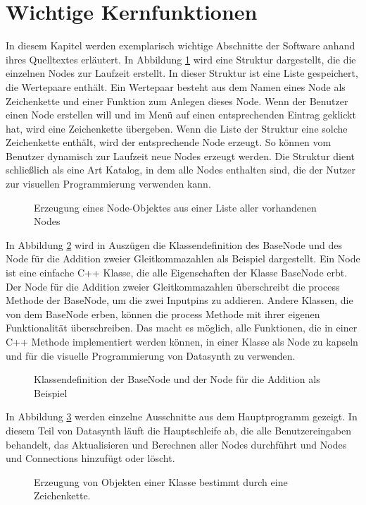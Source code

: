 \documentclass[a4paper, 
               12pt,
               DIV=calc,
               version=first,
               pdftex,
               headsepline,
               footsepline,
               bibtotocnumbered,
               liststotocnumbered]{scrreprt}
\begin{document}
\section{Wichtige Kernfunktionen}
\label{sec:Kernfunktionen}
In diesem Kapitel werden exemplarisch wichtige Abschnitte der Software anhand ihres Quelltextes
erläutert.
In Abbildung \ref{fig:factory} wird eine Struktur dargestellt, die die einzelnen
Nodes zur Laufzeit erstellt. In dieser Struktur ist eine Liste gespeichert, die Wertepaare
enthält. Ein Wertepaar besteht aus dem Namen eines Node als Zeichenkette und einer Funktion
zum Anlegen dieses Node.
Wenn der Benutzer einen Node erstellen will und im Menü auf einen entsprechenden Eintrag geklickt hat,
wird eine Zeichenkette übergeben. Wenn die Liste der Struktur eine solche Zeichenkette enthält, wird der
entsprechende Node erzeugt. So können vom Benutzer dynamisch zur Laufzeit
neue Nodes erzeugt werden. Die Struktur dient schließlich als eine Art Katalog, in dem alle
Nodes enthalten sind, die der Nutzer zur visuellen Programmierung verwenden kann.
\begin{figure}
\centering

\caption{Erzeugung eines Node-Objektes aus einer Liste aller vorhandenen Nodes}
\label{fig:factory}
\end{figure}
In Abbildung \ref{fig:node} wird in Auszügen die Klassendefinition des BaseNode und
des Node für die Addition zweier Gleitkommazahlen als Beispiel dargestellt.
Ein Node ist eine einfache C++ Klasse, die alle Eigenschaften der Klasse BaseNode erbt.
Der Node für die Addition zweier Gleitkommazahlen überschreibt die process Methode der BaseNode, um die zwei
Inputpins zu addieren. Andere Klassen, die von dem BaseNode erben, können die process
Methode mit ihrer eigenen Funktionalität überschreiben.
Das macht es möglich, alle Funktionen, die in einer C++ Methode implementiert werden können,
in einer Klasse als Node zu kapseln und für die visuelle Programmierung von Datasynth zu verwenden.
\begin{figure}
\centering

\caption{Klassendefinition der BaseNode und der Node für die Addition als Beispiel}
\label{fig:node}
\end{figure}
In Abbildung \ref{fig:core} werden einzelne Ausschnitte aus dem Hauptprogramm gezeigt.
In diesem Teil von Datasynth läuft die Hauptschleife ab, die alle Benutzereingaben behandelt,
das Aktualisieren und Berechnen aller Nodes durchführt und Nodes und Connections
hinzufügt oder löscht.
\begin{figure}
\centering

\caption{Erzeugung von Objekten einer Klasse bestimmt durch eine Zeichenkette.}
\label{fig:core}
\end{figure}
\end{document}
